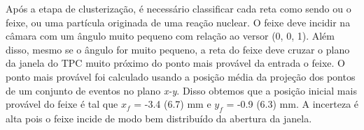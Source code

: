 \documentclass[a4paper,12pt,oneside]{book}
\begin{document}






\par Após a etapa de clusterização, é necessário classificar cada reta como sendo ou o feixe, ou uma partícula originada de uma reação nuclear. O feixe deve incidir na câmara com um ângulo muito pequeno com relação ao versor (0, 0, 1). Além disso, mesmo se o ângulo for muito pequeno, a reta do feixe deve cruzar o plano da janela do TPC muito próximo do ponto mais provável da entrada o feixe. O ponto mais provável foi calculado usando a posição média da projeção dos pontos de um conjunto de eventos no plano \textit{x-y}. Disso obtemos que a posição inicial mais provável do feixe é tal que $x_f$ = -3.4 (6.7) mm e $y_f$ = -0.9 (6.3) mm. A incerteza é alta pois o feixe incide de modo bem distribuído da abertura da janela.
\end{document}
